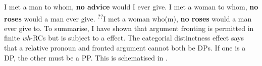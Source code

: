 \documentclass[output=paper]{langsci/langscibook}
\begin{document}
\ea\label{ex:key:2.51}
    \ea    I met a man to whom, \textbf{no advice} would I ever give.
    \ex    I met a woman to whom, \textbf{no roses} would a man ever give.
    \z
\z
\ea\label{ex:key:2.52}
    \ex    \textsuperscript{??}I met a woman who(m), \textbf{no roses} would a man ever give to.
    \z
\z
To summarise, I have shown that argument fronting is permitted in finite
\emph{wh}{-\glspl{RC} but is subject to a  effect. The
categorial distinctness effect says that a relative pronoun and fronted
argument cannot both be} DPs. If one is a DP, the other must be a PP\@. This is
schematised in .%
%
%
%
\end{document}
